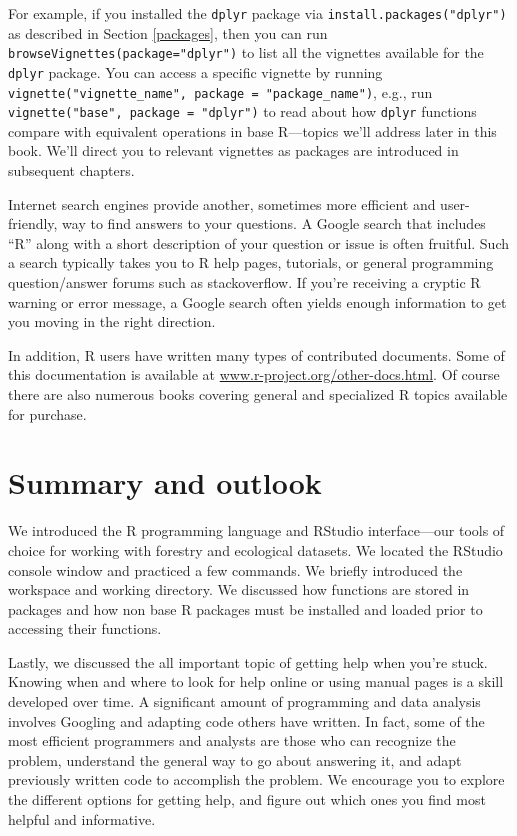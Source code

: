 \documentclass[
  11pt,
]{krantz}
\theoremstyle{definition}
\theoremstyle{definition}
\theoremstyle{definition}
\theoremstyle{definition}
\theoremstyle{remark}
\begin{document}
For example, if you installed the \texttt{dplyr} package via \texttt{install.packages("dplyr")} as described in Section \ref{packages}, then you can run \texttt{browseVignettes(package="dplyr")} to list all the vignettes available for the \texttt{dplyr} package. You can access a specific vignette by running \texttt{vignette("vignette\_name",\ package\ =\ "package\_name")}, e.g., run \texttt{vignette("base",\ package\ =\ "dplyr")} to read about how \texttt{dplyr} functions compare with equivalent operations in base R---topics we'll address later in this book. We'll direct you to relevant vignettes as packages are introduced in subsequent chapters.

Internet search engines provide another, sometimes more efficient and user-friendly, way to find answers to your questions. A Google search that includes ``R'' along with a short description of your question or issue is often fruitful. Such a search typically takes you to R help pages, tutorials, or general programming question/answer forums such as stackoverflow. If you're receiving a cryptic R warning or error message, a Google search often yields enough information to get you moving in the right direction.

In addition, R users have written many types of contributed documents. Some of this documentation is available at \url{www.r-project.org/other-docs.html}. Of course there are also numerous books covering general and specialized R topics available for purchase.

\hypertarget{summaryIntroR}{%
\section{Summary and outlook}\label{summaryIntroR}}

We introduced the R programming language and RStudio interface---our tools of choice for working with forestry and ecological datasets. We located the RStudio console window and practiced a few commands. We briefly introduced the workspace and working directory. We discussed how functions are stored in packages and how non base R packages must be installed and loaded prior to accessing their functions.

Lastly, we discussed the all important topic of getting help when you're stuck. Knowing when and where to look for help online or using manual pages is a skill developed over time. A significant amount of programming and data analysis involves Googling and adapting code others have written. In fact, some of the most efficient programmers and analysts are those who can recognize the problem, understand the general way to go about answering it, and adapt previously written code to accomplish the problem. We encourage you to explore the different options for getting help, and figure out which ones you find most helpful and informative.
\end{document}
